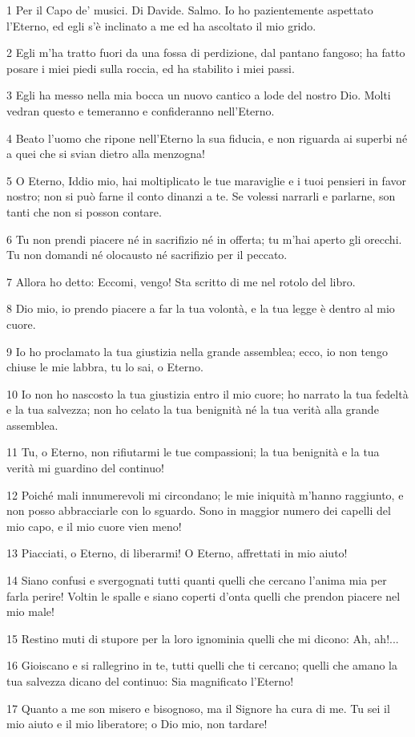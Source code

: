 \par 1 Per il Capo de' musici. Di Davide. Salmo. Io ho pazientemente aspettato l'Eterno, ed egli s'è inclinato a me ed ha ascoltato il mio grido.
\par 2 Egli m'ha tratto fuori da una fossa di perdizione, dal pantano fangoso; ha fatto posare i miei piedi sulla roccia, ed ha stabilito i miei passi.
\par 3 Egli ha messo nella mia bocca un nuovo cantico a lode del nostro Dio. Molti vedran questo e temeranno e confideranno nell'Eterno.
\par 4 Beato l'uomo che ripone nell'Eterno la sua fiducia, e non riguarda ai superbi né a quei che si svian dietro alla menzogna!
\par 5 O Eterno, Iddio mio, hai moltiplicato le tue maraviglie e i tuoi pensieri in favor nostro; non si può farne il conto dinanzi a te. Se volessi narrarli e parlarne, son tanti che non si posson contare.
\par 6 Tu non prendi piacere né in sacrifizio né in offerta; tu m'hai aperto gli orecchi. Tu non domandi né olocausto né sacrifizio per il peccato.
\par 7 Allora ho detto: Eccomi, vengo! Sta scritto di me nel rotolo del libro.
\par 8 Dio mio, io prendo piacere a far la tua volontà, e la tua legge è dentro al mio cuore.
\par 9 Io ho proclamato la tua giustizia nella grande assemblea; ecco, io non tengo chiuse le mie labbra, tu lo sai, o Eterno.
\par 10 Io non ho nascosto la tua giustizia entro il mio cuore; ho narrato la tua fedeltà e la tua salvezza; non ho celato la tua benignità né la tua verità alla grande assemblea.
\par 11 Tu, o Eterno, non rifiutarmi le tue compassioni; la tua benignità e la tua verità mi guardino del continuo!
\par 12 Poiché mali innumerevoli mi circondano; le mie iniquità m'hanno raggiunto, e non posso abbracciarle con lo sguardo. Sono in maggior numero dei capelli del mio capo, e il mio cuore vien meno!
\par 13 Piacciati, o Eterno, di liberarmi! O Eterno, affrettati in mio aiuto!
\par 14 Siano confusi e svergognati tutti quanti quelli che cercano l'anima mia per farla perire! Voltin le spalle e siano coperti d'onta quelli che prendon piacere nel mio male!
\par 15 Restino muti di stupore per la loro ignominia quelli che mi dicono: Ah, ah!...
\par 16 Gioiscano e si rallegrino in te, tutti quelli che ti cercano; quelli che amano la tua salvezza dicano del continuo: Sia magnificato l'Eterno!
\par 17 Quanto a me son misero e bisognoso, ma il Signore ha cura di me. Tu sei il mio aiuto e il mio liberatore; o Dio mio, non tardare!

